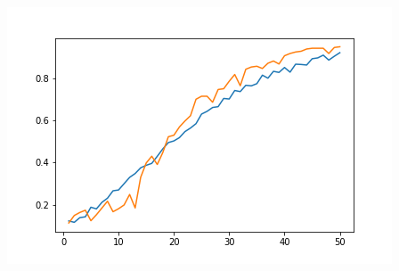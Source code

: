 \documentclass{article}
\begin{document}
\begin{sloppypar}
\begin{itemize}
\begin{center}
                \hfill
                \begin{minipage}[b]{0.45\linewidth}
                    \includegraphics[width = \linewidth]{analysis/optimizer/sgd/sgd.png}
                \end{minipage}
            \end{center}
    \end{itemize}

    
    

\end{sloppypar}
\end{document}
